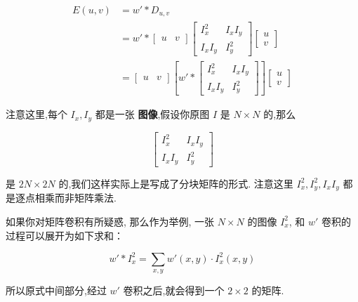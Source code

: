 \begin{equation}
    \begin{aligned}
    E(u,v)
    &= w' * D_{u,v}\\
    &= w' \ast \begin{bmatrix} u & v \end{bmatrix} \begin{bmatrix} I_x^2 & I_xI_y \\ I_xI_y & I_y^2 \end{bmatrix} \begin{bmatrix} u \\ v \end{bmatrix}\\
    &= \begin{bmatrix}
        u & v
        \end{bmatrix}
        \left[
        w' *
        \begin{bmatrix}
        I_x^2 & I_x I_y \\
        I_x I_y & I_y^2
        \end{bmatrix}
        \right]
        \begin{bmatrix}
        u \\
        v
        \end{bmatrix}
    \end{aligned}
\end{equation}

注意这里,每个 $I_x, I_y$ 都是一张 \textbf{图像},假设你原图 $I$ 是 $N \times N$ 的,那么

$$
\begin{bmatrix}
    I_x^2 & I_x I_y \\
    I_x I_y & I_y^2
\end{bmatrix}
$$

是 $2N \times 2N$ 的,我们这样实际上是写成了分块矩阵的形式. 注意这里 $I_x^2, I_y^2, I_xI_y$ 都是逐点相乘而非矩阵乘法.

如果你对矩阵卷积有所疑惑, 那么作为举例, 一张 $N \times N$ 的图像 $I_x^2$, 和 $w'$ 卷积的过程可以展开为如下求和：

\begin{equation}
    w' * I_x^2 = \sum_{x, y} w'(x, y) \cdot I_x^2(x, y)
\end{equation}

所以原式中间部分,经过 $w'$ 卷积之后,就会得到一个 $2 \times 2$ 的矩阵.

